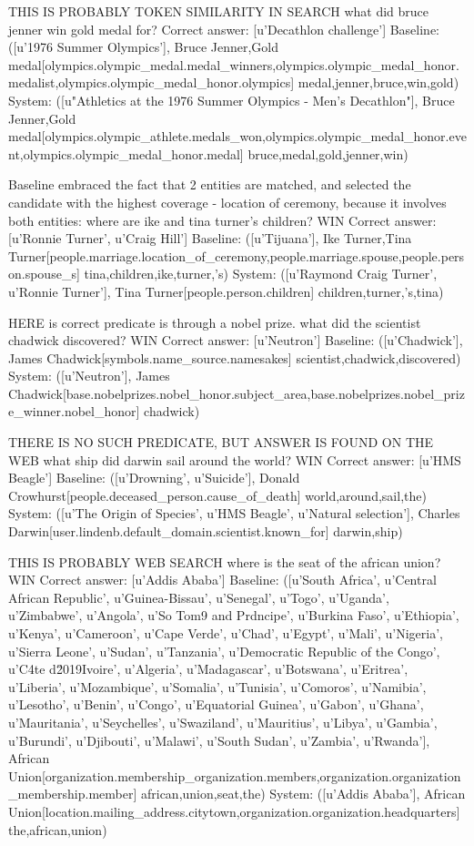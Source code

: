 THIS IS PROBABLY TOKEN SIMILARITY IN SEARCH
what did bruce jenner win gold medal for? 
Correct answer:  [u'Decathlon challenge']
Baseline:  ([u'1976 Summer Olympics'], Bruce Jenner,Gold medal[olympics.olympic\_medal.medal\_winners,olympics.olympic\_medal\_honor.medalist,olympics.olympic\_medal\_honor.olympics] medal,jenner,bruce,win,gold)
System:  ([u"Athletics at the 1976 Summer Olympics - Men's Decathlon"], Bruce Jenner,Gold medal[olympics.olympic\_athlete.medals\_won,olympics.olympic\_medal\_honor.event,olympics.olympic\_medal\_honor.medal] bruce,medal,gold,jenner,win)

Baseline embraced the fact that 2 entities are matched, and selected the candidate with the highest coverage - location of ceremony, because it involves both entities:
where are ike and tina turner's children? WIN
Correct answer:  [u'Ronnie Turner', u'Craig Hill']
Baseline:  ([u'Tijuana'], Ike Turner,Tina Turner[people.marriage.location\_of\_ceremony,people.marriage.spouse,people.person.spouse\_s] tina,children,ike,turner,'s)
System:  ([u'Raymond Craig Turner', u'Ronnie Turner'], Tina Turner[people.person.children] children,turner,'s,tina)

HERE is correct predicate is through a nobel prize.
what did the scientist chadwick discovered? WIN
Correct answer:  [u'Neutron']
Baseline:  ([u'Chadwick'], James Chadwick[symbols.name\_source.namesakes] scientist,chadwick,discovered)
System:  ([u'Neutron'], James Chadwick[base.nobelprizes.nobel\_honor.subject\_area,base.nobelprizes.nobel\_prize\_winner.nobel\_honor] chadwick)

THERE IS NO SUCH PREDICATE, BUT ANSWER IS FOUND ON THE WEB
what ship did darwin sail around the world? WIN
Correct answer:  [u'HMS Beagle']
Baseline:  ([u'Drowning', u'Suicide'], Donald Crowhurst[people.deceased\_person.cause\_of\_death] world,around,sail,the)
System:  ([u'The Origin of Species', u'HMS Beagle', u'Natural selection'], Charles Darwin[user.lindenb.default\_domain.scientist.known\_for] darwin,ship)

THIS IS PROBABLY WEB SEARCH
where is the seat of the african union? WIN
Correct answer:  [u'Addis Ababa']
Baseline:  ([u'South Africa', u'Central African Republic', u'Guinea-Bissau', u'Senegal', u'Togo', u'Uganda', u'Zimbabwe', u'Angola', u'So Tom9 and Prdncipe', u'Burkina Faso', u'Ethiopia', u'Kenya', u'Cameroon', u'Cape Verde', u'Chad', u'Egypt', u'Mali', u'Nigeria', u'Sierra Leone', u'Sudan', u'Tanzania', u'Democratic Republic of the Congo', u'C4te d\u2019Ivoire', u'Algeria', u'Madagascar', u'Botswana', u'Eritrea', u'Liberia', u'Mozambique', u'Somalia', u'Tunisia', u'Comoros', u'Namibia', u'Lesotho', u'Benin', u'Congo', u'Equatorial Guinea', u'Gabon', u'Ghana', u'Mauritania', u'Seychelles', u'Swaziland', u'Mauritius', u'Libya', u'Gambia', u'Burundi', u'Djibouti', u'Malawi', u'South Sudan', u'Zambia', u'Rwanda'], African Union[organization.membership\_organization.members,organization.organization\_membership.member] african,union,seat,the)
System:  ([u'Addis Ababa'], African Union[location.mailing\_address.citytown,organization.organization.headquarters] the,african,union)


